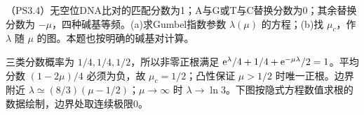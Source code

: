\begin{exercise}
（PS3.4）无空位DNA比对的匹配分数为1；A与G或T与C替换分数为0；其余替换分数为 $-\mu$，四种碱基等频。(a)求Gumbel指数参数 $\lambda(\mu)$ 的方程；(b)找 $\mu_c$，作 $\lambda$ 随 $\mu$ 的图。本题也按明确的碱基对计算。
\end{exercise}
\begin{solution}
三类分数概率为 $1/4,1/4,1/2$，所以非零正根满足 $\mathrm e^\lambda/4+1/4+\mathrm e^{-\mu\lambda}/2=1$。平均分数 $(1-2\mu)/4$ 必须为负，故 $\mu_c=1/2$；凸性保证 $\mu>1/2$ 时唯一正根。边界附近 $\lambda\simeq(8/3)(\mu-1/2)$；$\mu\to\infty$ 时 $\lambda\to\ln3$。下图按隐式方程数值求根的数据绘制，边界处取连续极限0。
\begin{center}\end{center}
\end{solution}
